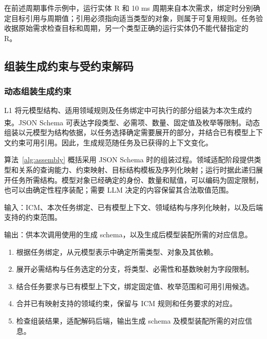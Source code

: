 \documentclass[pdflatex,iicol,sn-mathphys-num]{sn-jnl}
\newcommand{\paperref}[1]{\textsuperscript{\textcolor{citationred}{\citep{#1}}}}
\begin{document}
在前述周期事件示例中，运行实体 R 和 10 ms 周期来自本次需求，绑定时分别确定目标引用与周期值；引用必须指向适当类型的对象，则属于可复用规则。任务验收据原始需求检查目标和周期，另一个类型正确的运行实体仍不能代替指定的 R。


\subsection{组装生成约束与受约束解码}\label{sec:method-3-5}

\subsubsection{动态组装生成约束}\label{sec:method-3-5-1}

L1 将元模型结构、适用领域规则及任务绑定中可执行的部分组装为本次生成约束。JSON Schema 可表达字段类型、必需项、数量、固定值及枚举等限制\paperref{bhutton-json-schema-validation-01}。动态组装以元模型为结构依据，以任务选择确定需要展开的部分，并结合已有模型上下文约束可用引用。因此，生成规范随任务及已获得的上下文变化。


算法~\ref{alg:assembly} 概括采用 JSON Schema 时的组装过程。领域适配阶段提供类型和关系的查询能力、约束映射、目标结构模板及序列化映射；运行时据此递归展开任务所需结构。模型对象已经确定的身份、数量和赋值，可以编码为固定限制，也可以由确定性程序装配；需要 LLM 决定的内容保留其合法取值范围。


\begin{algorithm}[!tbp]

\caption{按任务组装 JSON Schema}\label{alg:assembly}

\small

输入：ICM、本次任务绑定、已有模型上下文、领域结构与序列化映射，以及后端支持的约束范围。\par

输出：供本次调用使用的生成 schema，以及生成后模型装配所需的对应信息。\par

\begin{enumerate}[leftmargin=1.7em,itemsep=2pt,topsep=4pt]

\item 根据任务绑定，从元模型表示中确定所需类型、对象及其依赖。

\item 展开必需结构与任务选定的分支，将类型、必需性和基数映射为字段限制。

\item 结合任务要求与已有模型上下文，绑定固定值、枚举范围和可用引用候选。

\item 合并已有映射支持的领域约束，保留与 ICM 规则和任务要求的对应。

\item 检查组装结果，适配解码后端，输出生成 schema 及模型装配所需的对应信息。

\end{enumerate}

\end{algorithm}
\end{document}
